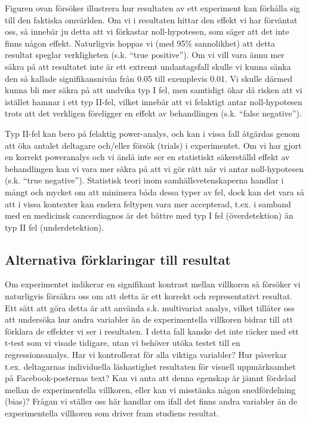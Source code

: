 \documentclass[
]{book}
\begin{document}
Figuren ovan försöker illustrera hur resultaten av ett experiment kan förhålla sig till den faktiska omvärlden. Om vi i resultaten hittar den effekt vi har förväntat oss, så innebär ju detta att vi förkastar noll-hypotesen, som säger att det inte finns någon effekt. Naturligvis hoppas vi (med 95\% sannolikhet) att detta resultat speglar verkligheten (s.k. ``true positive''). Om vi vill vara ännu mer säkra på att resultatet inte är ett extremt undantagsfall skulle vi kunna sänka den så kallade signifikansnivån från 0.05 till exemplevis 0.01. Vi skulle därmed kunna bli mer säkra på att undvika typ I fel, men samtidigt ökar då risken att vi istället hamnar i ett typ II-fel, vilket innebär att vi felaktigt antar noll-hypotesen trots att det verkligen föreligger en effekt av behandlingen (s.k. ``false negative'').

Typ II-fel kan bero på felaktig power-analys, och kan i vissa fall åtgärdas genom att öka antalet deltagare och/eller försök (trials) i experimentet. Om vi har gjort en korrekt poweranalys och vi ändå inte ser en statistiskt säkerställd effekt av behandlingen kan vi vara mer säkra på att vi gör rätt när vi antar noll-hypotesen (s.k. ``true negative''). Statistisk teori inom samhällsvetenskaperna handlar i mångt och mycket om att minimera båda dessa typer av fel, dock kan det vara så att i vissa kontexter kan endera feltypen vara mer accepterad, t.ex. i samband med en medicinsk cancerdiagnos är det bättre med typ I fel (överdetektion) än typ II fel (underdetektion).

\hypertarget{sub08.2.2}{%
\subsection{Alternativa förklaringar till resultat}\label{sub08.2.2}}

Om experimentet indikerar en signifikant kontrast mellan villkoren så försöker vi naturligvis försäkra oss om att detta är ett korrekt och representativt resultat. Ett sätt att göra detta är att använda s.k. multivariat analys, vilket tillåter oss att undersöka hur andra variabler än de experimentella villkoren bidrar till att förklara de effekter vi ser i resultaten. I detta fall kanske det inte räcker med ett t-test som vi visade tidigare, utan vi behöver utöka testet till en regressionsanalys. Har vi kontrollerat för alla viktiga variabler? Hur påverkar t.ex. deltagarnas individuella läshastighet resultaten för visuell uppmärksamhet på Facebook-posternas text? Kan vi anta att denna egenskap är jämnt fördelad mellan de experimentella villkoren, eller kan vi misstänka någon snedfördelning (bias)? Frågan vi ställer oss här handlar om ifall det finns andra variabler än de experimentella villkoren som driver fram studiens resultat.
\end{document}
